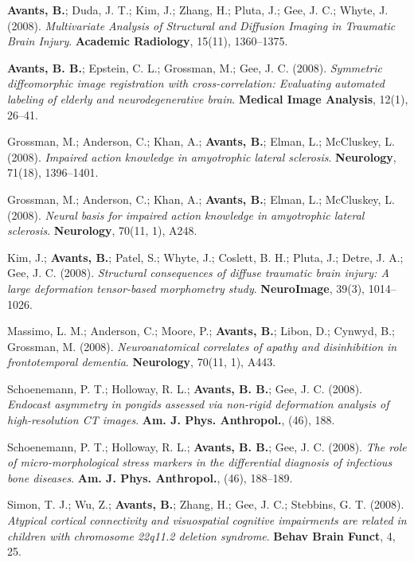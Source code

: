 \documentclass[10pt,letterpaper]{article}
\begin{document}
\begin{enumerate}
{  %
  \item \textbf{Avants, B.}; Duda, J. T.; Kim, J.; Zhang, H.; Pluta, J.; Gee, J. C.; Whyte, J. (2008). \textit{Multivariate Analysis of Structural and Diffusion Imaging in Traumatic Brain Injury}. \textbf{Academic Radiology}, 15(11), 1360--1375.
  \item \textbf{Avants, B. B.}; Epstein, C. L.; Grossman, M.; Gee, J. C. (2008). \textit{Symmetric diffeomorphic image registration with cross-correlation: Evaluating automated labeling of elderly and neurodegenerative brain}. \textbf{Medical Image Analysis}, 12(1), 26--41.
  \item Grossman, M.; Anderson, C.; Khan, A.; \textbf{Avants, B.}; Elman, L.; McCluskey, L. (2008). \textit{Impaired action knowledge in amyotrophic lateral sclerosis}. \textbf{Neurology}, 71(18), 1396--1401.
  \item Grossman, M.; Anderson, C.; Khan, A.; \textbf{Avants, B.}; Elman, L.; McCluskey, L. (2008). \textit{Neural basis for impaired action knowledge in amyotrophic lateral sclerosis}. \textbf{Neurology}, 70(11, 1), A248.
  \item Kim, J.; \textbf{Avants, B.}; Patel, S.; Whyte, J.; Coslett, B. H.; Pluta, J.; Detre, J. A.; Gee, J. C. (2008). \textit{Structural consequences of diffuse traumatic brain injury: A large deformation tensor-based morphometry study}. \textbf{NeuroImage}, 39(3), 1014--1026.
  \item Massimo, L. M.; Anderson, C.; Moore, P.; \textbf{Avants, B.}; Libon, D.; Cynwyd, B.; Grossman, M. (2008). \textit{Neuroanatomical correlates of apathy and disinhibition in frontotemporal dementia}. \textbf{Neurology}, 70(11, 1), A443.
  \item Schoenemann, P. T.; Holloway, R. L.; \textbf{Avants, B. B.}; Gee, J. C. (2008). \textit{Endocast asymmetry in pongids assessed via non-rigid deformation analysis of high-resolution CT images}. \textbf{Am. J. Phys. Anthropol.}, (46), 188.
  \item Schoenemann, P. T.; Holloway, R. L.; \textbf{Avants, B. B.}; Gee, J. C. (2008). \textit{The role of micro-morphological stress markers in the differential diagnosis of infectious bone diseases}. \textbf{Am. J. Phys. Anthropol.}, (46), 188--189.
  \item Simon, T. J.; Wu, Z.; \textbf{Avants, B.}; Zhang, H.; Gee, J. C.; Stebbins, G. T. (2008). \textit{Atypical cortical connectivity and visuospatial cognitive impairments are related in children with chromosome 22q11.2 deletion syndrome}. \textbf{Behav Brain Funct}, 4, 25.

}
\end{enumerate}
\end{document}
